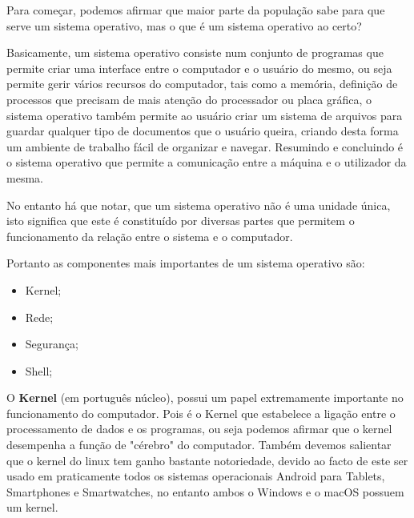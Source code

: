 \documentclass{report}
\begin{document}
Para começar, podemos afirmar que maior parte da população sabe para que serve um sistema operativo, mas o que é um sistema operativo ao certo?

Basicamente, um sistema operativo consiste num conjunto de programas que permite criar uma interface entre o computador e o usuário do mesmo, ou seja permite gerir vários recursos do computador, tais como a memória, definição de processos que precisam de mais atenção do processador ou placa gráfica, o sistema operativo também permite ao usuário criar um sistema de arquivos para guardar qualquer tipo de documentos que o usuário queira, criando desta forma um ambiente de trabalho fácil de organizar e navegar. Resumindo e concluindo é o sistema operativo que permite a comunicação entre a máquina e o utilizador da mesma.

\vspace{5mm} %

No entanto há que notar, que um sistema operativo não é uma unidade única, isto significa que este é constituído por diversas partes que permitem o funcionamento da relação entre o sistema e o computador.

Portanto as componentes mais importantes de um sistema operativo são:

\vspace{5mm} %

\begin{itemize}
    \item Kernel;
    \item Rede;
    \item Segurança;
    \item Shell;
\end{itemize}

\vspace{5mm} %

O \textbf{Kernel} (em português núcleo), possui um papel extremamente importante no funcionamento do computador. Pois é o Kernel que estabelece a ligação entre o processamento de dados e os programas, ou seja podemos afirmar que o kernel desempenha a função de "cérebro" do computador. Também devemos salientar que o kernel do linux tem ganho bastante notoriedade, devido ao facto de este ser usado em praticamente todos os sistemas operacionais Android para Tablets, Smartphones e Smartwatches, no entanto ambos o Windows e o macOS possuem um kernel.

\vspace{5mm} %
\end{document}
